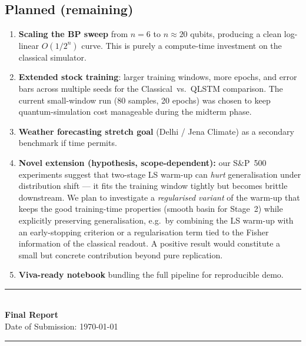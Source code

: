 \documentclass[10pt,twocolumn]{article}
\begin{document}
\subsection*{Planned (remaining)}
\begin{enumerate}
  \item \textbf{Scaling the BP sweep} from $n{=}6$ to $n \approx 20$ qubits, producing a clean log-linear $O(1/2^n)$ curve. This is purely a compute-time investment on the classical simulator.
  \item \textbf{Extended stock training}: larger training windows, more epochs, and error bars across multiple seeds for the Classical~vs.~QLSTM comparison. The current small-window run (80 samples, 20 epochs) was chosen to keep quantum-simulation cost manageable during the midterm phase.
  \item \textbf{Weather forecasting stretch goal} (Delhi / Jena Climate) as a secondary benchmark if time permits.
  \item \textbf{Novel extension (hypothesis, scope-dependent):} our S\&P~500 experiments suggest that two-stage LS warm-up can \emph{hurt} generalisation under distribution shift — it fits the training window tightly but becomes brittle downstream. We plan to investigate a \emph{regularised variant} of the warm-up that keeps the good training-time properties (smooth basin for Stage~2) while explicitly preserving generalisation, e.g.\ by combining the LS warm-up with an early-stopping criterion or a regularisation term tied to the Fisher information of the classical readout. A positive result would constitute a small but concrete contribution beyond pure replication.
  \item \textbf{Viva-ready notebook} bundling the full pipeline for reproducible demo.
\end{enumerate}



\vspace{6pt}
\begin{center}
\rule{0.8\linewidth}{0.8pt}\\[4pt]
{\large\bfseries\color{accentblue} Final Report}\\[2pt]
{\small Date of Submission: \today}\\[2pt]
\rule{0.8\linewidth}{0.8pt}
\end{center}
\vspace{4pt}
\end{document}
